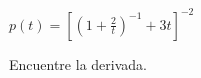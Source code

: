 \item $\displaystyle p(t) = \left[ \left(1 + \frac{2}{t}\right)^{-1} + 3t \right]^{-2}$
\par
Encuentre la derivada.
